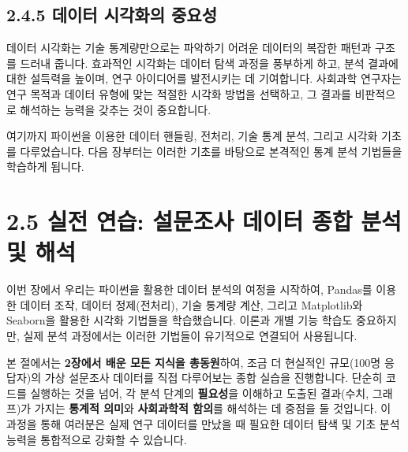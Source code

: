 \documentclass[
  letterpaper,
]{book}
\begin{document}
\subsection{2.4.5 데이터 시각화의
중요성}\label{uxb370uxc774uxd130-uxc2dcuxac01uxd654uxc758-uxc911uxc694uxc131}

데이터 시각화는 기술 통계량만으로는 파악하기 어려운 데이터의 복잡한
패턴과 구조를 드러내 줍니다. 효과적인 시각화는 데이터 탐색 과정을
풍부하게 하고, 분석 결과에 대한 설득력을 높이며, 연구 아이디어를
발전시키는 데 기여합니다. 사회과학 연구자는 연구 목적과 데이터 유형에
맞는 적절한 시각화 방법을 선택하고, 그 결과를 비판적으로 해석하는 능력을
갖추는 것이 중요합니다.

여기까지 파이썬을 이용한 데이터 핸들링, 전처리, 기술 통계 분석, 그리고
시각화 기초를 다루었습니다. 다음 장부터는 이러한 기초를 바탕으로
본격적인 통계 분석 기법들을 학습하게 됩니다.

\section{2.5 실전 연습: 설문조사 데이터 종합 분석 및
해석}\label{sec-chapter2-practice}

이번 장에서 우리는 파이썬을 활용한 데이터 분석의 여정을 시작하여,
Pandas를 이용한 데이터 조작, 데이터 정제(전처리), 기술 통계량 계산,
그리고 Matplotlib와 Seaborn을 활용한 시각화 기법들을 학습했습니다.
이론과 개별 기능 학습도 중요하지만, 실제 분석 과정에서는 이러한 기법들이
유기적으로 연결되어 사용됩니다.

본 절에서는 \textbf{2장에서 배운 모든 지식을 총동원}하여, 조금 더
현실적인 규모(100명 응답자)의 가상 설문조사 데이터를 직접 다루어보는
종합 실습을 진행합니다. 단순히 코드를 실행하는 것을 넘어, 각 분석 단계의
\textbf{필요성}을 이해하고 도출된 결과(수치, 그래프)가 가지는
\textbf{통계적 의미}와 \textbf{사회과학적 함의}를 해석하는 데 중점을 둘
것입니다. 이 과정을 통해 여러분은 실제 연구 데이터를 만났을 때 필요한
데이터 탐색 및 기초 분석 능력을 통합적으로 강화할 수 있습니다.
\end{document}
